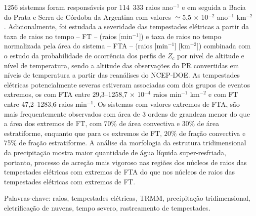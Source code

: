 \documentclass[12pt,a4paper,tocpage=plain,floatnumber=continuous,chapter=TITLE,appendix=nobox,font=plain, header=ruled,hyperindex=false]{abnt}
\begin{document}
\begin{resumo}
1256 sistemas foram responsáveis por 114~333 raios ano$^{-1}$ e em seguida a Bacia do Prata e Serra de Córdoba da Argentina com valores $\simeq$5,5 $\times$ 10$^{-2}$ ano$^{-1}$ km$^{-2}$. Adicionalmente, foi estudada a severidade das tempestades elétricas a partir da taxa de raios no tempo -- FT -- (raios [min$^{-1}$]) e taxa de raios no tempo normalizada pela área do sistema -- FTA -- (raios [min$^{-1}$] [km$^{-2}$]) combinada com o estudo da probabilidade de ocorrência dos perfis de $Z_c$ por nível de altitude e nível de temperatura, sendo a altitude das observações do PR convertidas em níveis de temperatura a partir das reanálises do NCEP-DOE. As tempestades elétricas potencialmente severas estiveram associadas com dois grupos de eventos extremos, os com FTA entre 29,3--1258,7 $\times$ 10$^{-4}$ raios min$^{-1}$ km$^{-2}$ e com FT entre 47,2--1283,6 raios min$^{-1}$. Os sistemas com valores extremos de FTA, são mais frequentemente observados com área de 3 ordens de grandeza menor do que a área dos extremos de FT, com 70\% de área convectiva e 30\% de área estratiforme, enquanto que para os extremos de FT, 20\% de fração convectiva e 75\% de fração estratiforme. A análise da morfologia da estrutura tridimensional da precipitação mostra maior quantidade de água líquida super-resfriada, portanto, processo de acreção mais vigoroso nas regiões dos núcleos de raios das tempestades elétricas com extremos de FTA do que nos núcleos de raios das tempestades elétricas com extremos de FT.

\bigskip
\bigskip
Palavras-chave: raios, tempestades elétricas, TRMM, precipitação tridimensional, eletrificação de nuvens, tempo severo, rastreamento de tempestades.
\end{resumo}
\end{document}
